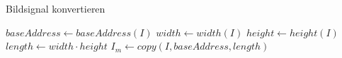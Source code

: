 \begin{algorithm}
	\caption{Bildsignal konvertieren}
	\label{src:analyseConvertMonochrome}
	\begin{algorithmic}[1]
			\State $baseAddress \gets baseAddress\left(I\right)$
			\label{src:analyseConvertMonochromeBaseaddress}
			\State $width \gets width\left(I\right)$
			\State $height \gets height\left(I\right)$
			\State $length \gets width \cdot height$
			\State $I_m \gets copy\left(I, baseAddress, length\right)$
		\EndProcedure
	\end{algorithmic}
\end{algorithm}
